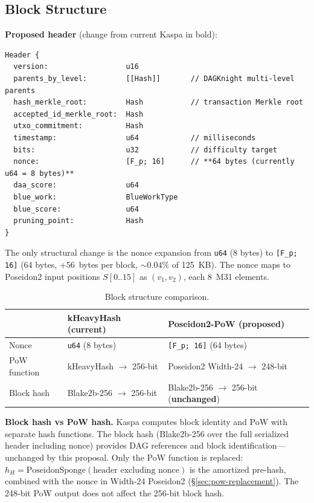 \documentclass[11pt,a4paper]{article}
\begin{document}
\subsection{Block Structure}
\label{sec:block}

\textbf{Proposed header} (change from current Kaspa in bold):

\begin{Verbatim}[fontsize=\small]
Header {
  version:                  u16
  parents_by_level:         [[Hash]]       // DAGKnight multi-level parents
  hash_merkle_root:         Hash           // transaction Merkle root
  accepted_id_merkle_root:  Hash
  utxo_commitment:          Hash
  timestamp:                u64            // milliseconds
  bits:                     u32            // difficulty target
  nonce:                    [F_p; 16]      // **64 bytes (currently u64 = 8 bytes)**
  daa_score:                u64
  blue_work:                BlueWorkType
  blue_score:               u64
  pruning_point:            Hash
}
\end{Verbatim}

The only structural change is the nonce expansion from \texttt{u64} (8 bytes) to \texttt{[F\_p; 16]} (64 bytes, +56~bytes per block, ${\sim}0.04\%$ of 125~KB). The nonce maps to Poseidon2 input positions $S[0..15]$ as $(v_1, v_2)$, each 8~M31 elements.

\begin{table}[h]
\centering
\begin{tabular}{@{}lll@{}}
\toprule
 & kHeavyHash (current) & Poseidon2-PoW (proposed) \\
\midrule
Nonce & \texttt{u64} (8 bytes) & \texttt{[F\_p; 16]} (64 bytes) \\
PoW function & kHeavyHash $\to$ 256-bit & Poseidon2 Width-24 $\to$ 248-bit \\
Block hash & Blake2b-256 $\to$ 256-bit & Blake2b-256 $\to$ 256-bit (\textbf{unchanged}) \\
\bottomrule
\end{tabular}
\caption{Block structure comparison.}
\label{tab:block}
\end{table}

\textbf{Block hash vs PoW hash.} Kaspa computes block identity and PoW with separate hash functions. The block hash (Blake2b-256 over the full serialized header including nonce) provides DAG references and block identification---unchanged by this proposal. Only the PoW function is replaced: $h_H = \mathrm{PoseidonSponge}(\text{header excluding nonce})$ is the amortized pre-hash, combined with the nonce in Width-24 Poseidon2 (\S\ref{sec:pow-replacement}). The 248-bit PoW output does not affect the 256-bit block hash.
\end{document}
